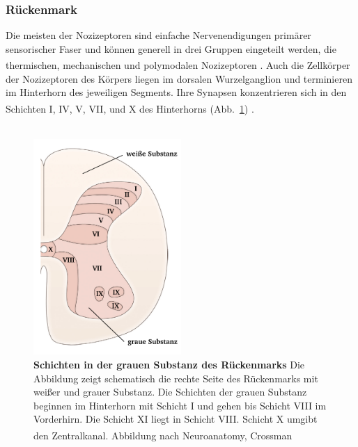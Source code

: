 \documentclass[12pt,a4paper,pdftex]{article}
\begin{document}
\subsubsection*{Rückenmark}

Die meisten der Nozizeptoren  sind einfache Nervenendigungen primärer sensorischer Faser und können generell in drei Gruppen eingeteilt werden, die thermischen, mechanischen und polymodalen Nozizeptoren \textsuperscript{\cite[24]{kandel2013principles}}. Auch die Zellkörper der Nozizeptoren des Körpers liegen im dorsalen Wurzelganglion und terminieren im Hinterhorn des jeweiligen Segments. Ihre Synapsen konzentrieren sich in den Schichten I, IV, V, VII, und X des Hinterhorns (Abb.~\ref{fig:graymatter}) \textsuperscript{\cite[25]{paxinos2014rat}}.
\\
\\

\begin{figure}[H]
        \centering
        \includegraphics[width = 0.5\textwidth]
        {pictures/somatosensory/gray_matter.png}
        \caption[Schichten in der grauen Substanz des Rückenmarks]{\textbf{Schichten in der grauen Substanz des Rückenmarks} Die Abbildung zeigt schematisch die rechte Seite des Rückenmarks mit weißer und grauer Substanz. Die Schichten der grauen Substanz beginnen im Hinterhorn mit Schicht I und gehen bis Schicht VIII im Vorderhirn. Die Schicht XI liegt in Schicht VIII. Schicht X umgibt den Zentralkanal. Abbildung nach Neuroanatomy, Crossman
        \textsuperscript{\cite[8]{crossman2014neuroanatomy}}}
        \label{fig:graymatter}
    \end{figure}
\end{document}
